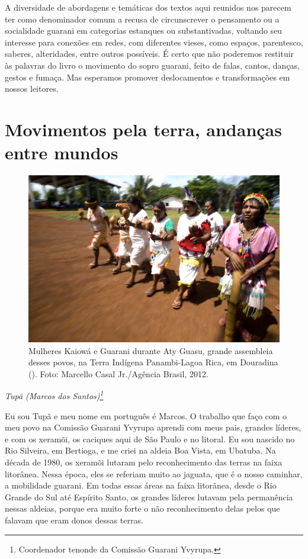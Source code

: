 A diversidade de abordagens e temáticas dos textos aqui reunidos nos
parecem ter como denominador comum a recusa de circunscrever o
pensamento ou a socialidade guarani em categorias estanques ou
substantivadas, voltando seu interesse para conexões em redes, com
diferentes vieses, como espaços, parentesco, saberes, alteridades,
entre outros possíveis. É certo que não poderemos restituir às palavras
do livro o movimento do sopro guarani, feito de falas, cantos, danças,
gestos e fumaça. Mas esperamos promover deslocamentos e transformações
em nossos leitores. 

\part{Movimentos pela terra, andanças entre mundos}

\begin{figure}
  \centering
 \includegraphics[width=\textwidth]{./img/GUARANIS-img1.jpg}	
  \hfill
  \caption{Mulheres Kaiowá e Guarani durante Aty Guasu, grande assembleia desses
povos, na Terra Indígena Panambi-Lagoa Rica, em Douradina (). Foto:
Marcello Casal Jr./Agência Brasil, 2012.}
\end{figure}


 

\begin{flushright}
\emph{Tupã (Marcos dos Santos)\footnote{Coordenador tenonde da Comissão
Guarani Yvyrupa.}}
\end{flushright}
\medskip

Eu sou Tupã e meu nome em português é Marcos. O trabalho que faço com o
meu povo na Comissão Guarani Yvyrupa aprendi com meus pais, grandes
líderes, e com os xeramõi, os caciques aqui de São Paulo e no litoral.
Eu sou nascido no Rio Silveira, em Bertioga, e me criei na aldeia Boa
Vista, em Ubatuba. Na década de 1980, os xeramõi lutaram pelo
reconhecimento das terras na faixa litorânea. Nessa época, eles se
referiam muito ao jaguata, que é o nosso caminhar, a mobilidade
guarani. Em todas essas áreas na faixa litorânea, desde o Rio Grande do
Sul até Espírito Santo, os grandes líderes lutavam pela permanência
nessas aldeias, porque era muito forte o não reconhecimento delas pelos
que falavam que eram donos dessas terras. 

